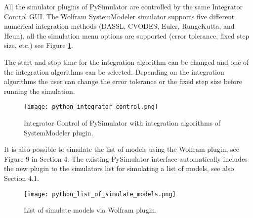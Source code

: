 All the simulator plugins of PySimulator are controlled by the same Integrator Control GUI. The Wolfram
SystemModeler simulator supports five different numerical integration methods (DASSL, CVODES,
Euler, RungeKutta, and Heun), all the simulation menu options are supported (error tolerance, fixed step
size, etc.) see Figure \ref{fig:pythonintegratorcontrol}.

The start and stop time for the integration algorithm can be changed and one of the integration algorithms
can be selected. Depending on the integration algorithms the user can change the error tolerance or
the fixed step size before running the simulation.

\begin{figure}
	\texttt{[image: python\_integrator\_control.png]}
	\caption{Integrator Control of PySimulator with integration algorithms of SystemModeler plugin.}
	\label{fig:pythonintegratorcontrol}
\end{figure}


It is also possible to simulate the list of models using the Wolfram plugin, see Figure 9 in Section 4. The
existing PySimulator interface automatically includes the new plugin to the simulators list for simulating a
list of models, see also Section 4.1.

\begin{figure}
	\texttt{[image: python\_list\_of\_simulate\_models.png]}
	\caption{List of simulate models via Wolfram plugin.}
	\label{fig:pythonlistofsimulatemodels}
\end{figure}




